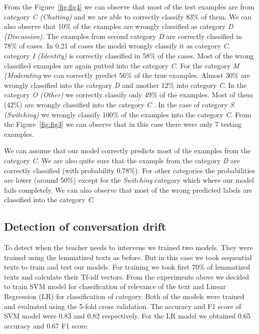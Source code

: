 \documentclass[11pt,a4paper]{article}
\begin{document}
From the Figure~\ref{fig:fig4} we can observe that most of the test examples are from category \textit{C (Chatting)} and we are able to correctly classify 83\% of them.
We can also observe that 10\% of the examples are wrongly classified as category \textit{D (Discussion)}.
The examples from second category \textit{D} are correctly classified in 78\% of cases.
In 0.21 of cases the model wrongly classify it as category \textit{C}.
category \textit{I (Identity)} is correctly classified in 58\% of the cases.
Most of the wrong classified examples are again putted into the category \textit{C}.
For the category \textit{M (Moderating} we can correctly predict 56\% of the true examples.
Almost 30\% are wrongly classified into the category \textit{D} and another 12\% into category \textit{C}.
In the category \textit{O (Other)} we correctly classify only 49\% of the examples.
Most of them (42\%) are wrongly classified into the category \textit{C }.
In the case of category \textit{S (Switching)} we wrongly classify 100\% of the examples into the category \textit{C}.
From the Figure~\ref{fig:fig3} we can observe that in this case there were only 7 testing examples.

We can assume that our model correctly predicts most of the examples from the category \textit{C}.
We are also quite sure that the exampls from the category \textit{D} are correctly classified (with probability 0.78\%).
For other categories the probabilities are lower (around 50\%) except for the \textit{Switching} category which where our model fails completely.
We can also observe that most of the wrong predicted labels are classified into the category \textit{C}.

\subsection{Detection of conversation drift}
To detect when the teacher needs to intervene we trained two models.
They were trained using the lemmatized texts as before.
But in this case we took sequential texts to train and test our models.
For training we took first 70\% of lemmatized texts and calculate their Tf-idf vectors.
From the experiments above we decided to train SVM model for classification of relevance of the text and Linear Regression (LR) for classification of category.
Both of the models were trained and evaluated using the 5-fold cross validation.
The accuracy and F1 score of SVM model were 0.83 and 0.82 respectively.
For the LR model we obtained 0.65 accuracy and 0.67 F1 score.
\end{document}
